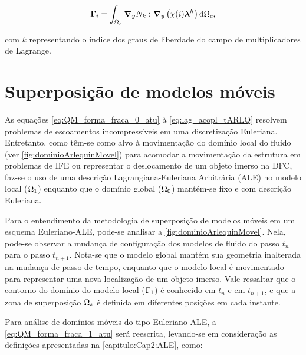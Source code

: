 \begin{align}
	\mathbf{\Gamma}_{i} = \int_{\Omega_c} \boldsymbol{\nabla}_y N_{k} : \boldsymbol{\nabla}_y \left(\chi (i) \boldsymbol{\lambda}^h\right)    \mathrm{d} \Omega_c,
\end{align}

\noindent com $k$ representando o índice dos graus de liberdade do campo de multiplicadores de Lagrange.

\section{Superposição de modelos móveis}

As equações \autoref{eq:QM_forma_fraca_0_atu} à \autoref{eq:lag_acopl_tARLQ} resolvem problemas de escoamentos incompressíveis em uma discretização Euleriana. Entretanto, como têm-se como alvo à movimentação do domínio local do fluido (ver \autoref{fig:dominioArlequinMovel}) para acomodar a movimentação da estrutura em problemas de IFE ou representar o deslocamento de um objeto imerso na DFC, faz-se o uso de uma descrição Lagrangiana-Euleriana Arbitrária (ALE) no modelo local ($\Omega_1$) enquanto que o domínio global ($\Omega_0$) mantém-se fixo e com descrição Euleriana. 

Para o entendimento da metodologia de superposição de modelos móveis em um esquema Euleriano-ALE, pode-se analisar a \autoref{fig:dominioArlequinMovel}. Nela, pode-se observar a mudança de configuração dos modelos de fluido do passo $t_n$ para o passo $t_{n+1}$. Nota-se que o modelo global mantém sua geometria inalterada na mudança de passo de tempo, enquanto que o modelo local é movimentado para representar uma nova localização de um objeto imerso. Vale ressaltar que o contorno do domínio do modelo local ($\Gamma_1$) é conhecido em $t_n$ e em $t_{n+1}$, e que a zona de superposição $\Omega_s$ é definida em diferentes posições em cada instante.

Para análise de domínios móveis do tipo Euleriano-ALE, a \autoref{eq:QM_forma_fraca_1_atu} será reescrita, levando-se em consideração as definições apresentadas na \autoref{capitulo:Cap2:ALE}, como:


